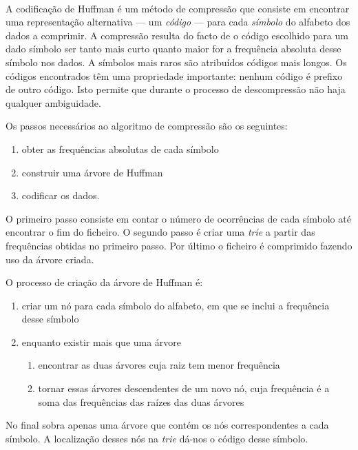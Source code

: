\paragraph{} A codificação de Huffman é um método de compressão que consiste em encontrar uma representação alternativa --- um \emph{código} --- para cada \emph{símbolo} do alfabeto dos dados a comprimir. A compressão resulta do facto de o código escolhido para um dado símbolo ser tanto mais curto quanto maior for a frequência absoluta desse símbolo nos dados. A símbolos mais raros são atribuídos códigos mais longos. Os códigos encontrados têm uma propriedade importante: nenhum código é prefixo de outro código. Isto permite que durante o processo de descompressão não haja qualquer ambiguidade.

Os passos necessários ao algoritmo de compressão são os seguintes:

\begin{enumerate}
  \item obter as frequências absolutas de cada símbolo
  \item construir uma árvore de Huffman
  \item codificar os dados.
\end{enumerate}

O primeiro passo consiste em contar o número de ocorrências de cada símbolo até encontrar o fim do ficheiro. O segundo passo é criar uma \emph{trie} a partir das frequências obtidas no primeiro passo. Por último o ficheiro é comprimido fazendo uso da árvore criada.

O processo de criação da árvore de Huffman é:

\begin{enumerate}
  \item criar um nó para cada símbolo do alfabeto, em que se inclui a frequência desse símbolo
  \item enquanto existir mais que uma árvore
    \begin{enumerate}
    \item encontrar as duas árvores cuja raiz tem menor frequência
    \item tornar essas árvores descendentes de um novo nó, cuja frequência é a soma das frequências das raízes das duas árvores
  \end{enumerate}
\end{enumerate}

No final sobra apenas uma árvore que contém os nós correspondentes a cada símbolo. A localização desses nós na \textit{trie} dá-nos o código desse símbolo.

